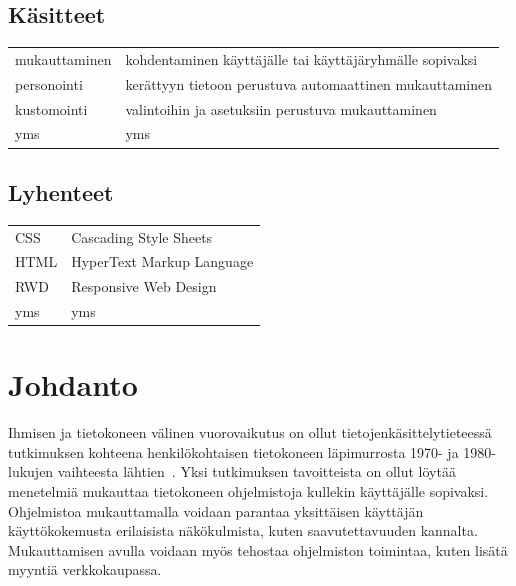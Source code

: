 \documentclass[finnish, 12pt, a4paper, elec, utf8, a-1b, online]{aaltothesis}
\date{xx.xx.2022}
\begin{document}
\makecoverpage{}

\makecopyrightpage{}

\begin{abstractpage}[finnish]
\end{abstractpage}

\thesistableofcontents{}


\subsection*{Käsitteet}

\begin{tabular}{ll}
    mukauttaminen & kohdentaminen käyttäjälle tai käyttäjäryhmälle sopivaksi \\
    personointi   & kerättyyn tietoon perustuva automaattinen mukauttaminen  \\
    kustomointi   & valintoihin ja asetuksiin perustuva mukauttaminen        \\
    yms           & yms
\end{tabular}

\subsection*{Lyhenteet}

\begin{tabular}{ll}
    CSS  & Cascading Style Sheets    \\
    HTML & HyperText Markup Language \\
    RWD  & Responsive Web Design     \\
    yms  & yms
\end{tabular}

\cleardoublepage{}

\section{Johdanto}

Ihmisen ja tietokoneen välinen vuorovaikutus on ollut tietojenkäsittelytieteessä
tutkimuksen kohteena henkilökohtaisen tietokoneen läpimurrosta 1970- ja
1980-lukujen vaihteesta lähtien~\cite{10.1145/800178.810088}. Yksi tutkimuksen
tavoitteista on ollut löytää menetelmiä mukauttaa tietokoneen ohjelmistoja
kullekin käyttäjälle sopivaksi. Ohjelmistoa mukauttamalla voidaan parantaa
yksittäisen käyttäjän käyttökokemusta erilaisista näkökulmista, kuten
saavutettavuuden kannalta. Mukauttamisen avulla voidaan myös tehostaa
ohjelmiston toimintaa, kuten lisätä myyntiä verkkokaupassa.
\end{document}
